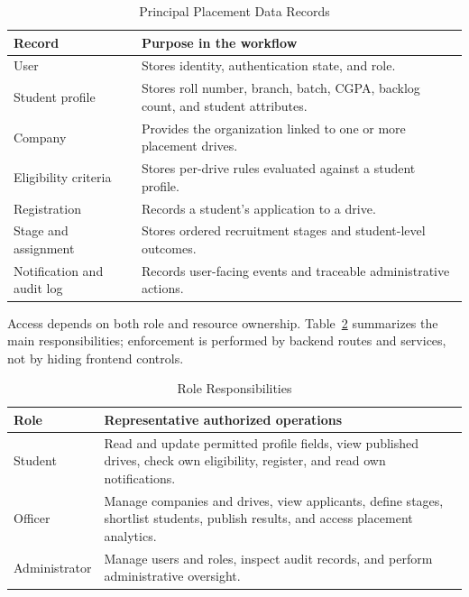 \documentclass[conference,final]{IEEEtran}
\begin{document}
\begin{table}[!t]
\caption{Principal Placement Data Records}
\label{tab:entities}
\centering
\footnotesize
\begin{tabular}{p{} p{}}
\toprule
\textbf{Record} & \textbf{Purpose in the workflow} \\
\midrule
User & Stores identity, authentication state, and role. \\
Student profile & Stores roll number, branch, batch, CGPA, backlog count, and student attributes. \\
Company & Provides the organization linked to one or more placement drives. \\
Eligibility criteria & Stores per-drive rules evaluated against a student profile. \\
Registration & Records a student's application to a drive. \\
Stage and assignment & Stores ordered recruitment stages and student-level outcomes. \\
Notification and audit log & Records user-facing events and traceable administrative actions. \\
\bottomrule
\end{tabular}
\end{table}

Access depends on both role and resource ownership. Table~\ref{tab:permissions} summarizes the main responsibilities; enforcement is performed by backend routes and services, not by hiding frontend controls.

\begin{table}[!t]
\caption{Role Responsibilities}
\label{tab:permissions}
\centering
\footnotesize
\begin{tabular}{p{} p{}}
\toprule
\textbf{Role} & \textbf{Representative authorized operations} \\
\midrule
Student & Read and update permitted profile fields, view published drives, check own eligibility, register, and read own notifications. \\
Officer & Manage companies and drives, view applicants, define stages, shortlist students, publish results, and access placement analytics. \\
Administrator & Manage users and roles, inspect audit records, and perform administrative oversight. \\
\bottomrule
\end{tabular}
\end{table}
\end{document}
